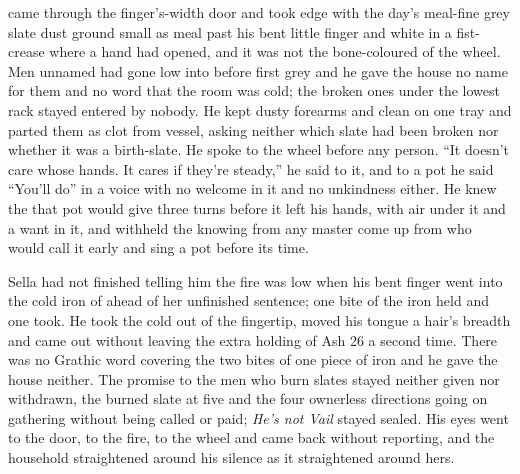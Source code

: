  came through the finger's-width door and took  edge with the day's meal-fine grey slate dust ground small as meal past his bent little finger and white in a fist-crease where a hand had opened, and it was not the bone-coloured  of the wheel. Men unnamed had gone low into  before first grey and he gave the house no name for them and no word that the room was cold; the broken ones under the lowest rack stayed entered by nobody. He kept dusty forearms and clean on one tray and parted them as clot from vessel, asking neither which slate had been broken nor whether it was a birth-slate. He spoke to the wheel before any person. “It doesn't care whose hands. It cares if they're steady,” he said to it, and to a pot he said “You'll do” in a voice with no welcome in it and no unkindness either. He knew the  that pot would give three turns before it left his hands, with air under it and a want in it, and withheld the knowing from any master come up from  who would call it early and sing a pot before its time.

Sella had not finished telling him the fire was low when his bent finger went into the cold iron of  ahead of her unfinished sentence; one bite of the iron held and one took. He took the cold out of the fingertip, moved his tongue a hair's breadth and came out without leaving the extra holding of Ash 26 a second time. There was no Grathic word covering the two bites of one piece of iron and he gave the house neither. The promise to the men who burn slates stayed neither given nor withdrawn, the burned slate at five and the four ownerless directions going on gathering without being called or paid; \emph{He's not Vail} stayed sealed. His eyes went to the door, to the fire, to the wheel and came back without reporting, and the household straightened around his silence as it straightened around hers.

